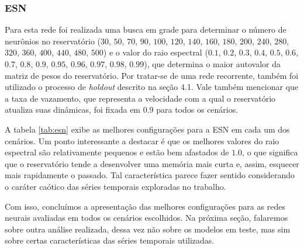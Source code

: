 \documentclass[a4paper, 12pt]{article}
\begin{document}
\subsubsection{ESN}

Para esta rede foi realizada uma busca em grade para determinar o número de neurônios no reservatório ($30$, $50$, $70$, $90$, $100$, $120$, $140$, $160$, $180$, $200$, $240$, $280$, $320$, $360$, $400$, $440$, $480$, $500$) e o valor do raio espectral ($0.1$, $0.2$, $0.3$, $0.4$, $0.5$, $0.6$, $0.7$, $0.8$, $0.9$, $0.95$, $0.96$, $0.97$, $0.98$, $0.99$), que determina o maior autovalor da matriz de pesos do reservatório. Por tratar-se de uma rede recorrente, também foi utilizado o processo de \textit{holdout} descrito na seção 4.1. Vale também mencionar que a taxa de vazamento, que representa a velocidade com a qual o reservatório atualiza suas dinâmicas, foi fixada em $0.9$ para todos os cenários.

A tabela \ref{tab:esn} exibe as melhores configurações para a ESN em cada um dos cenários. Um ponto interessante a destacar é que os melhores valores do raio espectral são relativamente pequenos e estão bem afastados de $1.0$, o que significa que o reservatório tende a desenvolver uma memória mais curta e, assim, esquecer mais rapidamente o passado. Tal característica parece fazer sentido considerando o caráter caótico das séries temporais exploradas no trabalho. 
\begin{table}[H]
\begin{center}
\caption{Melhores parâmetros para a rede ESN nos cenários em análise.}
\label{tab:esn}
\end{center}
\end{table}

Com isso, concluímos a apresentação das melhores configurações para as redes neurais avaliadas em todos os cenários escolhidos. Na próxima seção, falaremos sobre outra análise realizada, dessa vez não sobre os modelos em teste, mas sim sobre certas características das séries temporais utilizadas. 
\end{document}
